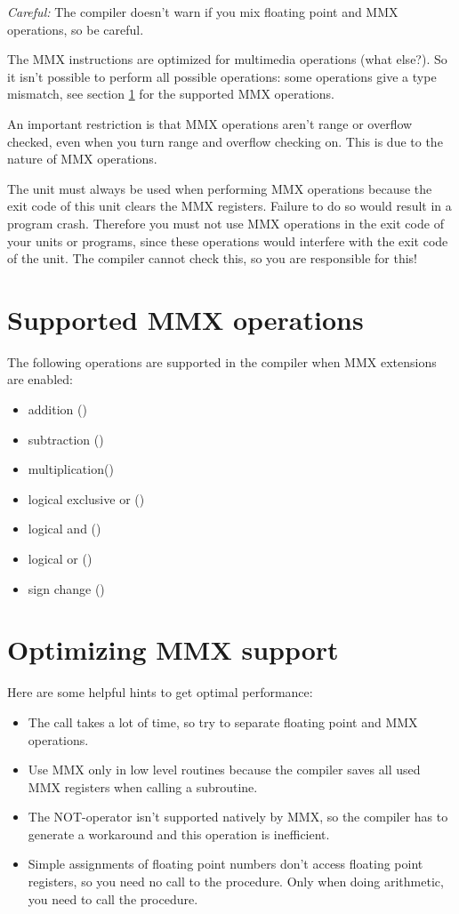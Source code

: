 {\em Careful:} The compiler doesn't warn if you mix floating point and
MMX operations, so be careful.

The MMX instructions are optimized for multimedia operations (what else?).
So it isn't possible to perform all possible operations: some operations
give a type mismatch, see section \ref{se:SupportedMMX} for the supported
MMX operations.

An important restriction is that MMX operations aren't range or overflow
checked, even when you turn range and overflow checking on. This is due to
the nature of MMX operations.

The  unit must always be used when performing MMX operations
because the exit code of this unit clears the MMX registers. Failure to do
so would result in a program crash. Therefore you must not use
MMX operations in the exit code of your units or programs, since these
operations would interfere with the exit code of the  unit. 
The compiler cannot check this, so you are responsible for this!

\section{Supported MMX operations}
\label{se:SupportedMMX}
The following operations are supported in the compiler when MMX
extensions are enabled:
\begin{itemize}
\item addition (\var{+})
\item subtraction (\var{-})
\item multiplication(\var{*})
\item logical exclusive or ()
\item logical and ()
\item logical or ()
\item sign change (\var{-})
\end{itemize}

\section{Optimizing MMX support}
\label{se:OptimizingMMX}
Here are some helpful hints to get optimal performance:
\begin{itemize}
\item The  call takes a lot of time, so try to separate floating
point and MMX operations.
\item Use MMX only in low level routines because the compiler
  saves all used MMX registers when calling a subroutine.
\item The NOT-operator isn't supported natively by MMX, so the
  compiler has to generate a workaround and this operation
  is inefficient.
\item Simple assignments of floating point numbers don't access
  floating point registers, so you need no call to the 
  procedure. Only when doing arithmetic, you need to call the 
procedure.
\end{itemize}

